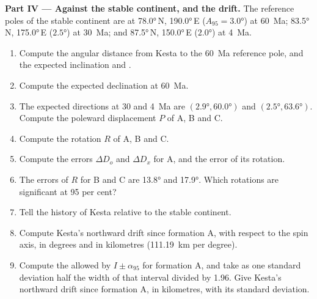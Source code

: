 \begin{problem}
\medskip\noindent\textbf{Part IV --- Against the stable continent, and the drift.} The
reference poles of the stable continent are at \ang{78.0}\,N, \ang{190.0}\,E
($A_{95} = \ang{3.0}$) at \qty{60}{Ma}; \ang{83.5}\,N, \ang{175.0}\,E
($\ang{2.5}$) at \qty{30}{Ma}; and \ang{87.5}\,N, \ang{150.0}\,E ($\ang{2.0}$)
at \qty{4}{Ma}.
\begin{enumerate}[resume]
  \item Compute the angular distance from Kesta to the \qty{60}{Ma} reference
        pole, and the expected inclination and .
  \item Compute the expected declination at \qty{60}{Ma}.
  \item The expected directions at 30 and \qty{4}{Ma} are $(\ang{2.9},
        \ang{60.0})$ and $(\ang{2.5}, \ang{63.6})$. Compute the poleward
        displacement $P$ of A, B and C.
  \item Compute the rotation $R$ of A, B and C.
  \item Compute the errors $\Delta D_o$ and $\Delta D_x$ for A, and the error
        of its rotation.
  \item The errors of $R$ for B and C are \ang{13.8} and \ang{17.9}. Which
        rotations are significant at 95 per cent?
  \item Tell the history of Kesta relative to the stable continent.
  \item Compute Kesta's northward drift since formation A, with respect to
        the spin axis, in degrees and in kilometres
        (\qty{111.19}{km} per degree).
  \item Compute the  allowed by $I \pm \alpha_{95}$ for
        formation A, and take as one standard deviation half the width of that
        interval divided by 1.96. Give Kesta's northward drift since formation
        A, in kilometres, with its standard deviation.
\end{enumerate}
\end{problem}
